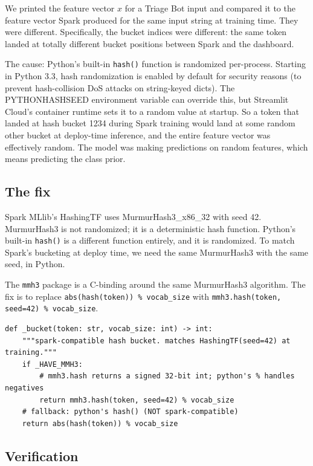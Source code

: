 \documentclass[11pt,letterpaper]{book}
\begin{document}
We printed the feature vector $x$ for a Triage Bot input and compared it to the feature vector Spark produced for the same input string at training time. They were different. Specifically, the bucket indices were different: the same token landed at totally different bucket positions between Spark and the dashboard.

The cause: Python's built-in \texttt{hash()} function is randomized per-process. Starting in Python 3.3, hash randomization is enabled by default for security reasons (to prevent hash-collision DoS attacks on string-keyed dicts). The PYTHONHASHSEED environment variable can override this, but Streamlit Cloud's container runtime sets it to a random value at startup. So a token that landed at hash bucket 1234 during Spark training would land at some random other bucket at deploy-time inference, and the entire feature vector was effectively random. The model was making predictions on random features, which means predicting the class prior.

\subsection*{The fix}

Spark MLlib's HashingTF uses MurmurHash3\_x86\_32 with seed 42. MurmurHash3 is not randomized; it is a deterministic hash function. Python's built-in \texttt{hash()} is a different function entirely, and it is randomized. To match Spark's bucketing at deploy time, we need the same MurmurHash3 with the same seed, in Python.

The \texttt{mmh3} package is a C-binding around the same MurmurHash3 algorithm. The fix is to replace \texttt{abs(hash(token)) \% vocab\_size} with \texttt{mmh3.hash(token, seed=42) \% vocab\_size}.

\begin{lstlisting}
def _bucket(token: str, vocab_size: int) -> int:
    """spark-compatible hash bucket. matches HashingTF(seed=42) at training."""
    if _HAVE_MMH3:
        # mmh3.hash returns a signed 32-bit int; python's % handles negatives
        return mmh3.hash(token, seed=42) % vocab_size
    # fallback: python's hash() (NOT spark-compatible)
    return abs(hash(token)) % vocab_size
\end{lstlisting}

\subsection*{Verification}
\end{document}
